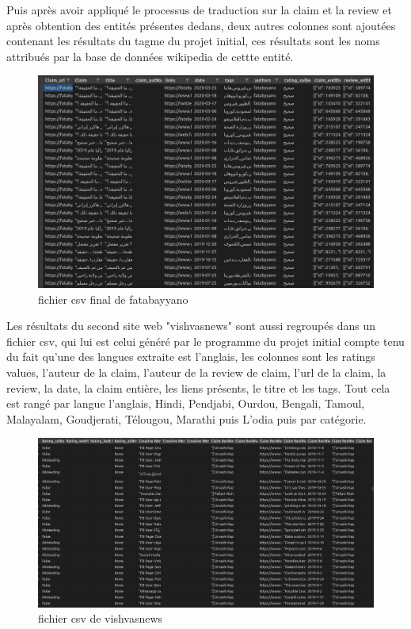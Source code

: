 \documentclass[oneside,13pt,a4paper]{report}
\begin{document}
Puis après avoir appliqué le processus de traduction sur la claim et la review et après obtention des entités présentes dedans, deux autres colonnes sont ajoutées contenant les résultats du tagme du projet initial, ces résultats sont les noms attribués par la base de données wikipedia de cettte entité.
\begin{figure}[h]
	\centering
	\begin{minipage}[c]{.5\linewidth}
		\includegraphics[width=1\textwidth]{img/fatab2.png}
		\caption{fichier csv final de fatabayyano}
	\end{minipage}
\end{figure}

Les résultats du second site web "vishvasnews" sont aussi regroupés dans un fichier csv, qui lui est celui généré par le programme du projet initial compte tenu du fait qu'une des langues extraite est l'anglais, les colonnes sont les ratings values, l'auteur de la claim, l'auteur de la review de claim, l'url de la claim, la review, la date, la claim entière, les liens présents, le titre et les tags. Tout cela est rangé par langue l'anglais, Hindi, Pendjabi, Ourdou, Bengali, Tamoul, Malayalam, Goudjerati, Télougou, Marathi puis L'odia puis par catégorie.
\begin{figure}[h]
	\centering
	\begin{minipage}[c]{.5\linewidth}
		\includegraphics[width=1\textwidth]{img/vishvas.png}
		\caption{fichier csv de vishvasnews}
	\end{minipage}
\end{figure}
\end{document}
